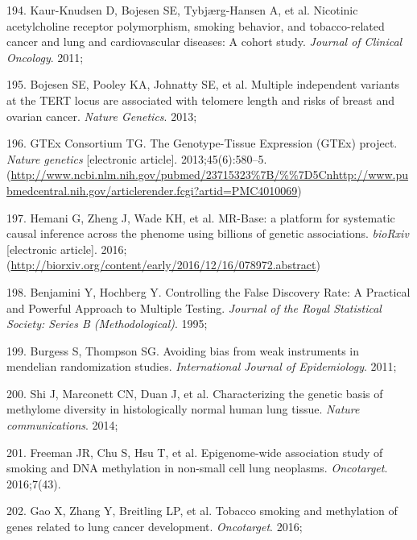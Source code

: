 \documentclass[11pt,oneside]{bristolthesis}
\newenvironment{cslreferences}%
  {}%
  {\par}
\begin{document}
\begin{cslreferences}
\leavevmode\hypertarget{ref-Kaur-Knudsen2011}{}%
194. Kaur-Knudsen D, Bojesen SE, Tybjærg-Hansen A, et al. Nicotinic acetylcholine receptor polymorphism, smoking behavior, and tobacco-related cancer and lung and cardiovascular diseases: A cohort study. \emph{Journal of Clinical Oncology}. 2011;

\leavevmode\hypertarget{ref-Bojesen2013}{}%
195. Bojesen SE, Pooley KA, Johnatty SE, et al. Multiple independent variants at the TERT locus are associated with telomere length and risks of breast and ovarian cancer. \emph{Nature Genetics}. 2013;

\leavevmode\hypertarget{ref-GTExConsortium2013}{}%
196. GTEx Consortium TG. The Genotype-Tissue Expression (GTEx) project. \emph{Nature genetics} {[}electronic article{]}. 2013;45(6):580--5. (\url{http://www.ncbi.nlm.nih.gov/pubmed/23715323\%7B/\%\%7D5Cnhttp://www.pubmedcentral.nih.gov/articlerender.fcgi?artid=PMC4010069})

\leavevmode\hypertarget{ref-Hemani2016}{}%
197. Hemani G, Zheng J, Wade KH, et al. MR-Base: a platform for systematic causal inference across the phenome using billions of genetic associations. \emph{bioRxiv} {[}electronic article{]}. 2016;(\url{http://biorxiv.org/content/early/2016/12/16/078972.abstract})

\leavevmode\hypertarget{ref-Benjamini1995}{}%
198. Benjamini Y, Hochberg Y. Controlling the False Discovery Rate: A Practical and Powerful Approach to Multiple Testing. \emph{Journal of the Royal Statistical Society: Series B (Methodological)}. 1995;

\leavevmode\hypertarget{ref-Burgess2011}{}%
199. Burgess S, Thompson SG. Avoiding bias from weak instruments in mendelian randomization studies. \emph{International Journal of Epidemiology}. 2011;

\leavevmode\hypertarget{ref-Shi2014}{}%
200. Shi J, Marconett CN, Duan J, et al. Characterizing the genetic basis of methylome diversity in histologically normal human lung tissue. \emph{Nature communications}. 2014;

\leavevmode\hypertarget{ref-Freeman2016}{}%
201. Freeman JR, Chu S, Hsu T, et al. Epigenome-wide association study of smoking and DNA methylation in non-small cell lung neoplasms. \emph{Oncotarget}. 2016;7(43).

\leavevmode\hypertarget{ref-Gao2016}{}%
202. Gao X, Zhang Y, Breitling LP, et al. Tobacco smoking and methylation of genes related to lung cancer development. \emph{Oncotarget}. 2016;
\end{cslreferences}
\end{document}

